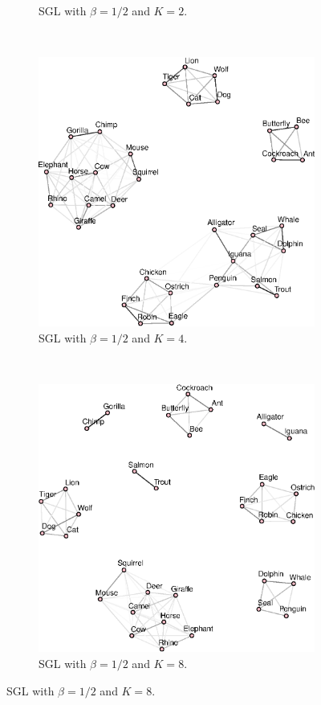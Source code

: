 \begin{figure}[!htb]
\begin{subfigure}[b]{0.475\textwidth}
      \caption{\textsf{SGL} with $\beta = 1/2$ and $K = 2$.}
    \end{subfigure}\\
    \begin{subfigure}[b]{0.475\textwidth}
      \includegraphics[width=\textwidth]{animals/graphs_for_different_k/animals_graph_k4.eps}
      \caption{\textsf{SGL} with $\beta = 1/2$ and $K = 4$.}
    \end{subfigure}
    ~
    \begin{subfigure}[b]{0.475\textwidth}
      \includegraphics[width=\textwidth]{animals/graphs_for_different_k/animals_graph_k8.eps}
      \caption{\textsf{SGL} with $\beta = 1/2$ and $K = 8$.}
    \end{subfigure}
    \label{fig:animals}
\end{figure}
